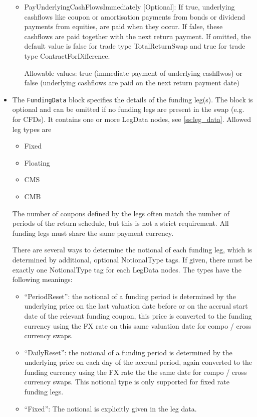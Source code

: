 \begin{itemize}
\begin{itemize}
  \item PayUnderlyingCashFlowsImmediately [Optional]: If true, underlying cashflows like coupon or amortisation payments
    from bonds or dividend payments from equities, are paid when they occur. If false, these cashflows are paid together
    with the next return payment. If omitted, the default value is false for trade type TotalReturnSwap and true for
    trade type ContractForDifference.

  Allowable values: true (immediate payment of underlying cashflwos) or false (underlying cashflows are paid on the next
                    return payment date)

\end{itemize}

\item The {\tt FundingData} block specifies the details of the funding leg(s). The block is optional and can be omitted
  if no funding legs are present in the swap (e.g. for CFDs). It contains one or more LegData nodes, see
  \ref{ss:leg_data}. Allowed leg types are
  \begin{itemize}
  \item Fixed
  \item Floating
  \item CMS
  \item CMB
  \end{itemize}
  The number of coupons defined by the legs often match the number of periods of the return schedule, but this is not a
  strict requirement. All funding legs must share the same payment currency.

  There are several ways to determine the notional of each funding leg, which is determined by additional, optional
  NotionalType tags. If given, there must be exactly one NotionalType tag for each LegData nodes. The types have the
  following meanings:

  \begin{itemize}
    \item ``PeriodReset'': the notional of a funding period is determined by the underlying price on the last valuation
      date before or on the accrual start date of the relevant funding coupon, this price is converted to the funding
      currency using the FX rate on this same valuation date for compo / cross currency swaps.
    \item ``DailyReset'': the notional of a funding period is determined by the underlying price on each day of the
      accrual period, again converted to the funding currency using the FX rate the the same date for compo / cross
      currency swaps. This notional type is only supported for fixed rate funding legs.
    \item ``Fixed'': The notional is explicitly given in the leg data.
  \end{itemize}


\end{itemize}
